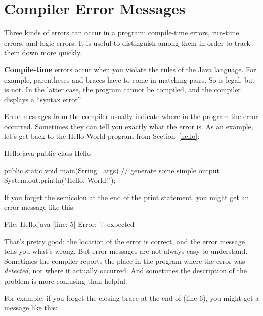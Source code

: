 \section{Compiler Error Messages}


Three kinds of errors can occur in a program: compile-time errors, run-time errors, and logic errors.
It is useful to distinguish among them in order to track them down more quickly.


{\bf Compile-time} errors occur when you violate the rules of the Java language.
For example, parentheses and braces have to come in matching pairs.
So  is legal, but  is not.
In the latter case, the program cannot be compiled, and the compiler displays a ``syntax error''.


Error messages from the compiler usually indicate where in the program the error occurred.
Sometimes they can tell you exactly what the error is.
As an example, let's get back to the Hello World program from Section~\ref{hello}:

\begin{trinket}[235]{Hello.java}
public class Hello {

    public static void main(String[] args) {
        // generate some simple output
        System.out.println("Hello, World!");
    }
}
\end{trinket}


If you forget the semicolon at the end of the print statement, you might get an error message like this:

\begin{stdout}
File: Hello.java  [line: 5]
Error: ';' expected
\end{stdout}

That's pretty good: the location of the error is correct, and the error message tells you what's wrong.
But error messages are not always easy to understand.
Sometimes the compiler reports the place in the program where the error was {\em detected}, not where it actually occurred.
And sometimes the description of the problem is more confusing than helpful.

For example, if you forget the closing brace at the end of  (line 6), you might get a message like this:


